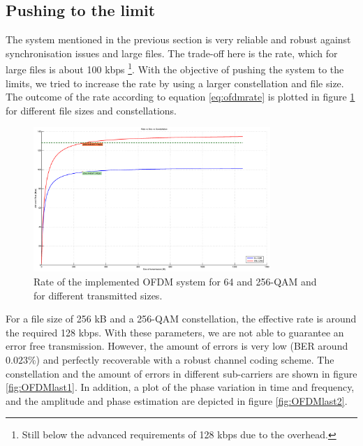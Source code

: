 \documentclass[12pt,a4paper,openright]{report}
\begin{document}
\subsection{Pushing to the limit}
The system mentioned in the previous section is very reliable and robust against synchronisation issues and large files. The trade-off here is the rate, which for large files is about 100 kbps \footnote{Still below the advanced requirements of 128 kbps due to the overhead.}. With the objective of pushing the system to the limits, we tried to increase the rate by using a larger constellation and file size. The outcome of the rate according to equation \ref{eq:ofdmrate} is plotted in figure \ref{fig:eqrate} for different file sizes and constellations. 
\begin{figure}[H]
	 \centering
\includegraphics[width=0.8\textwidth]{ratecurves.eps}
	    \caption[Rate plot for OFDM.]{Rate of the implemented OFDM system for 64 and 256-QAM and for different transmitted sizes.}
	    \label{fig:eqrate}	
\end{figure}
For a file size of 256 kB and a 256-QAM constellation, the effective rate is around the required 128 kbps. With these parameters, we are not able to guarantee an error free transmission. However, the amount of errors is very low (BER around $0.023\%$) and perfectly recoverable with a robust channel coding scheme. The constellation and the amount of errors in different sub-carriers are shown in figure \ref{fig:OFDMlast1}. In addition, a plot of the phase variation in time and frequency, and the amplitude and phase estimation are depicted in figure \ref{fig:OFDMlast2}.
\end{document}
